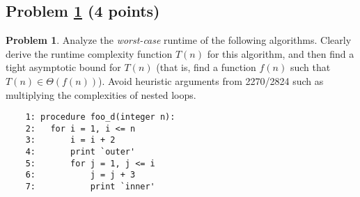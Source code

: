 \documentclass[11pt]{article}
\theoremstyle{definition}
\theoremstyle{definition}
\newtheorem{required}{Problem}
\theoremstyle{definition}
\begin{document}
\subsection{Problem \ref{1} (4 points)}
\begin{required}
\label{1} Analyze the \textit{worst-case} runtime of the following algorithms. Clearly derive the runtime complexity function $T(n)$ for this algorithm, and then find a tight asymptotic bound for $T(n)$ (that is, find a function $f(n)$ such that $T(n) \in \Theta(f(n))$). Avoid heuristic arguments from 2270/2824 such as multiplying the complexities of nested loops.

\begin{verbatim}
	1: procedure foo_d(integer n):
	2:   for i = 1, i <= n
	3:       i = i + 2
	4:       print `outer'
	5:       for j = 1, j <= i
	6:           j = j + 3
	7:           print `inner'
\end{verbatim}


\end{required}
\end{document}
